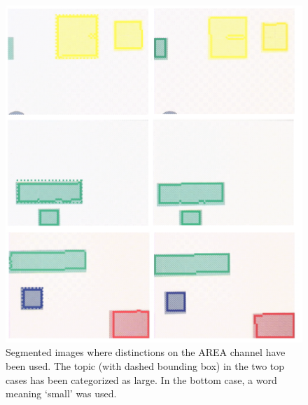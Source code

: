 \begin{figure}
\begin{center}
\includegraphics[width=0.8\columnwidth]{chap7/figs/plate-14-area}
\end{center}
\caption{ Segmented images where distinctions on the AREA channel have been used. The topic (with dashed bounding 
box) in the two top cases has been categorized as large. In the bottom case, a word meaning `small' was used.}
\label{fig:plate-14}
\end{figure}


